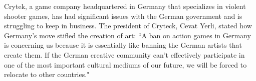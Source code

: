 
Crytek, a game company headquartered in Germany that specializes in violent shooter games, has had significant issues with the German government and is struggling to keep in business. The president of Cryteck, Cevat Yerli, stated how Germany's move stifled the creation of art: ``A ban on action games in Germany is concerning us because it is essentially like banning the German artists that create them. If the German creative community can't effectively participate in one of the most important cultural mediums of our future, we will be forced to relocate to other countries."

